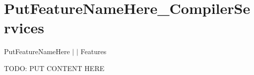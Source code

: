 \chapter{Put\+Feature\+Name\+Here\+\_\+\+Compiler\+Services }
\hypertarget{md__docs_2_compiler_services_2_features_2_put_feature_name_here___compiler_services}{}\label{md__docs_2_compiler_services_2_features_2_put_feature_name_here___compiler_services}
Put\+Feature\+Name\+Here \texorpdfstring{$\vert$}{|}  \texorpdfstring{$\vert$}{|} Features



TODO\+: PUT CONTENT HERE 